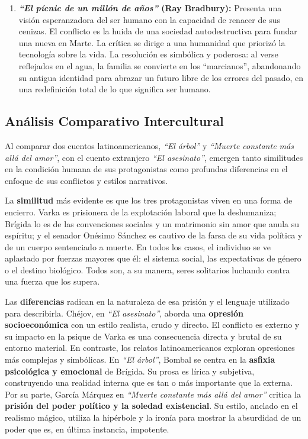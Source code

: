 \documentclass[12pt, letterpaper]{article}
\begin{document}
\begin{enumerate}[label=\arabic*., wide, labelindent=0pt]
	\item \textbf{\textit{``El pícnic de un millón de años''} (Ray Bradbury):} Presenta una visión esperanzadora del ser humano con la capacidad de renacer de sus cenizas. El conflicto es la huida de una sociedad autodestructiva para fundar una nueva en Marte. La crítica se dirige a una humanidad que priorizó la tecnología sobre la vida. La resolución es simbólica y poderosa: al verse reflejados en el agua, la familia se convierte en los ``marcianos'', abandonando su antigua identidad para abrazar un futuro libre de los errores del pasado, en una redefinición total de lo que significa ser humano.
\end{enumerate}

\subsection*{Análisis Comparativo Intercultural}

Al comparar dos cuentos latinoamericanos, \textit{``El árbol''} y \textit{``Muerte constante más allá del amor''}, con el cuento extranjero \textit{``El asesinato''}, emergen tanto similitudes en la condición humana de sus protagonistas como profundas diferencias en el enfoque de sus conflictos y estilos narrativos.

La \textbf{similitud} más evidente es que los tres protagonistas viven en una forma de encierro. Varka es prisionera de la explotación laboral que la deshumaniza; Brígida lo es de las convenciones sociales y un matrimonio sin amor que anula su espíritu; y el senador Onésimo Sánchez es cautivo de la farsa de su vida política y de un cuerpo sentenciado a muerte. En todos los casos, el individuo se ve aplastado por fuerzas mayores que él: el sistema social, las expectativas de género o el destino biológico. Todos son, a su manera, seres solitarios luchando contra una fuerza que los supera.

Las \textbf{diferencias} radican en la naturaleza de esa prisión y el lenguaje utilizado para describirla. Chéjov, en \textit{``El asesinato''}, aborda una \textbf{opresión socioeconómica} con un estilo realista, crudo y directo. El conflicto es externo y su impacto en la psique de Varka es una consecuencia directa y brutal de su entorno material. En contraste, los relatos latinoamericanos exploran opresiones más complejas y simbólicas. En \textit{``El árbol''}, Bombal se centra en la \textbf{asfixia psicológica y emocional} de Brígida. Su prosa es lírica y subjetiva, construyendo una realidad interna que es tan o más importante que la externa. Por su parte, García Márquez en \textit{``Muerte constante más allá del amor''} critica la \textbf{prisión del poder político y la soledad existencial}. Su estilo, anclado en el realismo mágico, utiliza la hipérbole y la ironía para mostrar la absurdidad de un poder que es, en última instancia, impotente.
\end{document}

